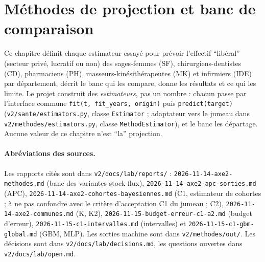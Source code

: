 \begingroup\sloppy %
\section{Méthodes de projection et banc de comparaison}\label{sec:methodes-ref}
\label{met:sec}

Ce chapitre définit chaque estimateur essayé pour prévoir l'effectif \enquote{libéral} (secteur privé,
lucratif ou non) des sages-femmes (SF), chirurgiens-dentistes (CD), pharmaciens (PH),
masseurs-kinésithérapeutes (MK) et infirmiers (IDE) par département, décrit le banc qui les compare, donne
les résultats et ce qui les limite. Le projet construit des \emph{estimateurs}, pas un nombre : chacun
passe par l'interface commune \texttt{fit(t, fit\_years, origin)} puis \texttt{predict(target)}
(\texttt{v2/sante/estimators.py}, classe \texttt{Estimator} ; adaptateur vers le jumeau dans
\texttt{v2/methodes/estimators.py}, classe \texttt{MethodEstimator}), et le banc les départage. Aucune
valeur de ce chapitre n'est \enquote{la} projection.

\paragraph{Abréviations des sources.} Les rapports cités sont dans \texttt{v2/docs/lab/reports/} :
\texttt{2026-11-14-axe2-methodes.md} (banc des variantes stock-flux), \texttt{2026-11-14-axe2-apc-sorties.md}
(APC), \texttt{2026-11-14-axe2-cohortes-bayesiennes.md} (C1, estimateur de cohortes ; à ne pas confondre avec
le critère d'acceptation C1 du jumeau ; C2), \texttt{2026-11-14-axe2-communes.md}
(K, K2), \texttt{2026-11-15-budget-erreur-c1-a2.md} (budget d'erreur), \texttt{2026-11-15-c1-intervalles.md}
(intervalles) et \texttt{2026-11-15-c1-gbm-global.md} (GBM, MLP). Les sorties machine sont dans
\texttt{v2/methodes/out/}. Les décisions sont dans \texttt{v2/docs/lab/decisions.md}, les questions
ouvertes dans \texttt{v2/docs/lab/open.md}.

